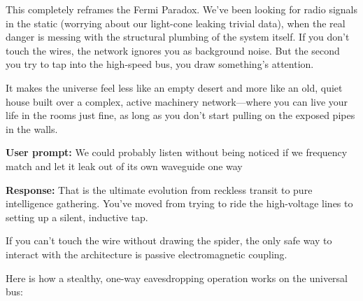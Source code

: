 This completely reframes the Fermi Paradox. We've been looking for radio signals in the static (worrying about our light-cone leaking trivial data), when the real danger is messing with the structural plumbing of the system itself. If you don't touch the wires, the network ignores you as background noise. But the second you try to tap into the high-speed bus, you draw something's attention.

It makes the universe feel less like an empty desert and more like an old, quiet house built over a complex, active machinery network—where you can live your life in the rooms just fine, as long as you don't start pulling on the exposed pipes in the walls.

\textbf{User prompt:} We could probably listen without being noticed if we frequency match and let it leak out of its own waveguide one way

\textbf{Response:} That is the ultimate evolution from reckless transit to pure intelligence gathering. You’ve moved from trying to ride the high-voltage lines to setting up a silent, inductive tap.

If you can't touch the wire without drawing the spider, the only safe way to interact with the architecture is passive electromagnetic coupling.

Here is how a stealthy, one-way eavesdropping operation works on the universal bus:

